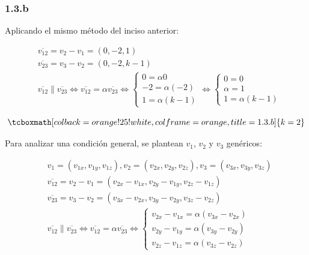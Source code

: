 \documentclass{article}
\begin{document}
\subsubsection*{1.3.b}
\label{subsubsec:1.3.b}

Aplicando el mismo método del inciso anterior:

\begin{subequations}
\begin{align}
& \overline{v_{12}} = v_2 - v_1 = (0, -2, 1) \\
& \overline{v_{23}} = v_3 - v_2 = (0, -2, k-1) \\
& \overline{v_{12}} \parallel \overline{v_{23}} \Leftrightarrow \overline{v_{12}} = \alpha \overline{v_{23}} \Leftrightarrow \left\{ \begin{array}{ll}
0 = \alpha 0 \\
-2 = \alpha (-2) \\
1 = \alpha (k-1)
\end{array} \right. \Leftrightarrow \left\{ \begin{array}{ll}
0 = 0 \\
\alpha = 1 \\
1 = \alpha (k-1)
\end{array} \right.
\end{align}
\end{subequations}

\begin{equation}
\tcboxmath[colback=orange!25!white,colframe=orange,title=1.3.b]
{ k = 2 }
\end{equation}

Para analizar una condición general, se plantean $v_1$, $v_2$ y $v_3$ genéricos:

\begin{subequations}
\begin{align}
& v_1 = (v_{1x}, v_{1y}, v_{1z}), v_2 = (v_{2x}, v_{2y}, v_{2z}), v_3 = (v_{3x}, v_{3y}, v_{3z}) \\
& \overline{v_{12}} = v_2 - v_1 = (v_{2x} - v_{1x}, v_{2y} - v_{1y}, v_{2z} - v_{1z}) \\
& \overline{v_{23}} = v_3 - v_2 = (v_{3x} - v_{2x}, v_{3y} - v_{2y}, v_{3z} - v_{2z}) \\
& \overline{v_{12}} \parallel \overline{v_{23}} \Leftrightarrow \overline{v_{12}} = \alpha \overline{v_{23}} \Leftrightarrow \left\{ \begin{array}{ll}
v_{2x} - v_{1x} = \alpha (v_{3x} - v_{2x}) \\
v_{2y} - v_{1y} = \alpha (v_{3y} - v_{2y}) \\
v_{2z} - v_{1z} = \alpha (v_{3z} - v_{2z})
\end{array} \right.
\end{align}
\end{subequations}
\end{document}
